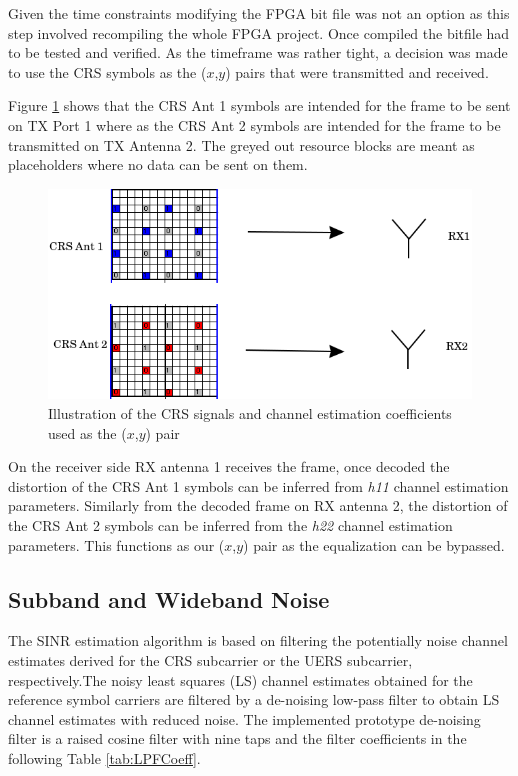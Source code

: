 Given the time constraints modifying the FPGA bit file was not an option as this step involved recompiling the whole FPGA project. Once compiled the bitfile had to be tested and verified. As the timeframe was rather tight, a decision was made to use the CRS symbols as the ($x$,$y$) pairs that were transmitted and received.

Figure \ref{fig:XYPairsCRS} shows that the CRS Ant 1 symbols are intended for the frame to be sent on TX Port 1 where as the CRS Ant 2 symbols are intended for the frame to be transmitted on TX Antenna 2. The greyed out resource blocks are meant as placeholders where no data can be sent on them.

\begin{figure}[!htb]
    \centering
    \includegraphics[width=\linewidth]{images/MultiAntennaCRSXYPairEdited.png}
    \caption{Illustration of the CRS signals and channel estimation coefficients used as the ($x$,$y$) pair}
    \label{fig:XYPairsCRS}
\end{figure}

On the receiver side RX antenna 1 receives the frame, once decoded the distortion of the CRS Ant 1 symbols can be inferred from \textit{h11} channel estimation parameters. Similarly from the decoded frame on RX antenna 2, the distortion of the CRS Ant 2 symbols can be inferred from the \textit{h22} channel estimation parameters. This functions as our ($x$,$y$) pair as the equalization can be bypassed.

\subsection{Subband and Wideband Noise}\label{ssec:SINR}

The SINR estimation algorithm is based on filtering the potentially noise channel estimates derived for the CRS subcarrier or the UERS subcarrier, respectively.The noisy least squares (LS) channel estimates obtained for the reference symbol carriers are filtered by a de-noising low-pass filter to obtain LS channel estimates with reduced noise. The implemented prototype de-noising filter is a raised cosine filter with nine taps and the filter coefficients in the following Table \ref{tab:LPFCoeff}.

